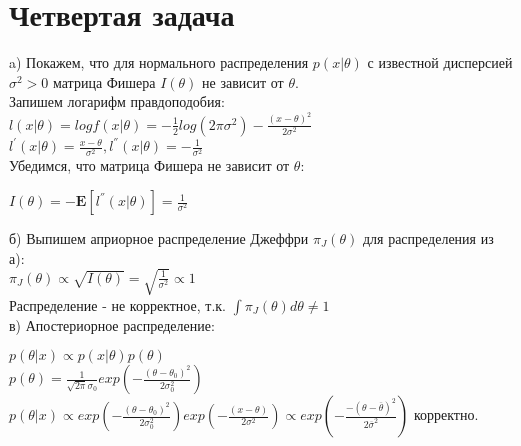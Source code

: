 \documentclass{article}
\begin{document}
\section{Четвертая задача}
a) Покажем, что для нормального распределения $p(x|\theta)$ с известной дисперсией $\sigma^2 > 0$ матрица Фишера $I(\theta)$ не зависит от $\theta$.\\
Запишем логарифм правдоподобия:\\
$l(x|\theta) = logf(x|\theta) = -\frac{1}{2}log(2\pi\sigma^2) - \frac{(x-\theta)^2}{2\sigma^2}$\\
$l^{'}(x|\theta) = \frac{x-\theta}{\sigma^2}, l^{''}(x|\theta) = -\frac{1}{\sigma^2}$\\
Убедимся, что матрица Фишера не зависит от $\theta$:
\begin{center}
$I(\theta) = -\mathbf{E}[l^{''}(x|\theta)] = \frac{1}{\sigma^2}$
\end{center}
б) Выпишем априорное распределение Джеффри $\pi_J(\theta)$ для распределения из а):\\
$\pi_J(\theta) \propto \sqrt{I(\theta)} = \sqrt{\frac{1}{\sigma^2}} \propto 1$\\
Распределение - не корректное, т.к. $\int \pi_J(\theta)d\theta \neq 1$\\
в) Апостериорное распределение:
\begin{center}
$p(\theta|x) \propto p(x|\theta)p(\theta)$\\
$p(\theta) = \frac{1}{\sqrt{2\pi}\sigma_0}exp(-\frac{(\theta - \theta_0)^2}{2\sigma_0^2})$\\
$p(\theta|x) \propto exp(-\frac{(\theta - \theta_0)^2}{2\sigma_0^2})exp(-\frac{(x-\theta)}{2\sigma^2}) \propto exp(-\frac{-(\theta - \overline{\theta})^2}{2\overline{\sigma}^2})$ корректно.
\end{center}
\end{document}
